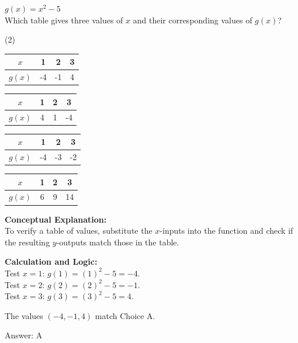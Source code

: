 \documentclass[11pt,paper=a4,answers]{exam}
\begin{document}
\begin{questions}
\question
$g(x) = x^2 - 5$ \\
Which table gives three values of $x$ and their corresponding values of $g(x)$?
\begin{tasks}(2)
    \task \begin{tabular}{|c|c|c|c|} \hline $x$ & 1 & 2 & 3 \\ \hline $g(x)$ & -4 & -1 & 4 \\ \hline \end{tabular}
    \task \begin{tabular}{|c|c|c|c|} \hline $x$ & 1 & 2 & 3 \\ \hline $g(x)$ & 4 & 1 & -4 \\ \hline \end{tabular}
    \task \begin{tabular}{|c|c|c|c|} \hline $x$ & 1 & 2 & 3 \\ \hline $g(x)$ & -4 & -3 & -2 \\ \hline \end{tabular}
    \task \begin{tabular}{|c|c|c|c|} \hline $x$ & 1 & 2 & 3 \\ \hline $g(x)$ & 6 & 9 & 14 \\ \hline \end{tabular}
\end{tasks}

\begin{solution}
\textbf{Conceptual Explanation:} \\
To verify a table of values, substitute the $x$-inputs into the function and check if the resulting $y$-outputs match those in the table.

\vspace{20pt}

\textbf{Calculation and Logic:} \\
Test $x = 1$: $g(1) = (1)^2 - 5 = -4$. \\
Test $x = 2$: $g(2) = (2)^2 - 5 = -1$. \\
Test $x = 3$: $g(3) = (3)^2 - 5 = 4$.

\vspace{10pt}

The values $(-4, -1, 4)$ match Choice A.

\vspace{25pt}

Answer: \colorbox{yellow!100}{A}
\end{solution}


\end{questions}
\end{document}
